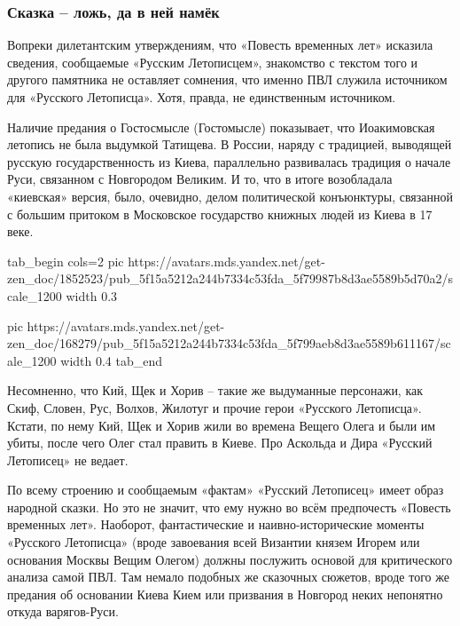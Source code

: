\subsubsection{Сказка – ложь, да в ней намёк}

Вопреки дилетантским утверждениям, что «Повесть временных лет» исказила
сведения, сообщаемые «Русским Летописцем», знакомство с текстом того и другого
памятника не оставляет сомнения, что именно ПВЛ служила источником для
«Русского Летописца». Хотя, правда, не единственным источником.

Наличие предания о Гостосмысле (Гостомысле) показывает, что Иоакимовская
летопись не была выдумкой Татищева. В России, наряду с традицией, выводящей
русскую государственность из Киева, параллельно развивалась традиция о начале
Руси, связанном с Новгородом Великим. И то, что в итоге возобладала «киевская»
версия, было, очевидно, делом политической конъюнктуры, связанной с большим
притоком в Московское государство книжных людей из Киева в 17 веке.

\ifcmt
tab_begin cols=2
  pic https://avatars.mds.yandex.net/get-zen_doc/1852523/pub_5f15a5212a244b7334c53fda_5f79987b8d3ae5589b5d70a2/scale_1200
	width 0.3

  pic https://avatars.mds.yandex.net/get-zen_doc/168279/pub_5f15a5212a244b7334c53fda_5f799aeb8d3ae5589b611167/scale_1200
	width 0.4
tab_end
\fi

Несомненно, что Кий, Щек и Хорив – такие же выдуманные персонажи, как Скиф,
Словен, Рус, Волхов, Жилотуг и прочие герои «Русского Летописца». Кстати, по
нему Кий, Щек и Хорив жили во времена Вещего Олега и были им убиты, после чего
Олег стал править в Киеве. Про Аскольда и Дира «Русский Летописец» не ведает.

По всему строению и сообщаемым «фактам» «Русский Летописец» имеет образ
народной сказки. Но это не значит, что ему нужно во всём предпочесть «Повесть
временных лет». Наоборот, фантастические и наивно-исторические моменты
«Русского Летописца» (вроде завоевания всей Византии князем Игорем или
основания Москвы Вещим Олегом) должны послужить основой для критического
анализа самой ПВЛ. Там немало подобных же сказочных сюжетов, вроде того же
предания об основании Киева Кием или призвания в Новгород неких непонятно
откуда варягов-Руси. 


